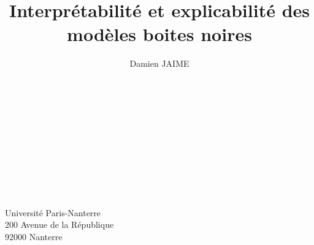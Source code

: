 \documentclass[12pt, a4paper, french, openright]{report}
\title{Interprétabilité et explicabilité des modèles boites noires}
\author{Damien JAIME}
\begin{document}


\newpage
~
\thispagestyle{empty}
\newpage

\thispagestyle{empty}


\newpage
~
\thispagestyle{empty}
\newpage

\thispagestyle{empty}


~
\thispagestyle{empty}

%


\newpage
~
\thispagestyle{empty}


\tableofcontents
\thispagestyle{empty}
\setcounter{page}{0}

\newpage
~
\thispagestyle{empty}
\setcounter{page}{0}
\newpage













\newpage



\newpage
\printbibliography

\newpage
\listoffigures

\newpage
\thispagestyle{empty}
\vspace*{\fill}
\begin{center}
  Université Paris-Nanterre\\
  200 Avenue de la République\\
  92000 Nanterre
\end{center}
\vspace*{\fill}
\end{document}
